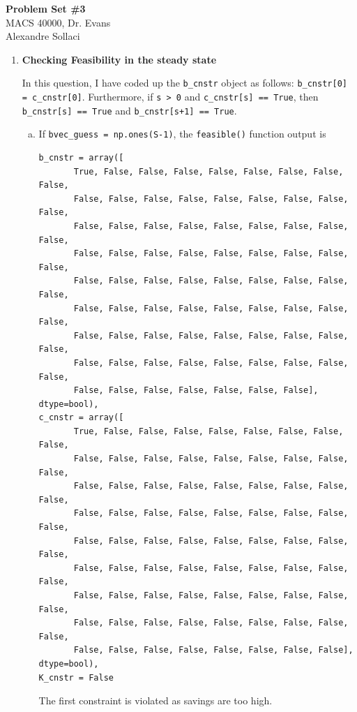 \documentclass[letterpaper,12pt]{article}
\theoremstyle{definition}
\begin{document}
\begin{flushleft}
   \textbf{\large{Problem Set \#3}} \\
   MACS 40000, Dr. Evans \\
   Alexandre Sollaci
\end{flushleft}

\vspace{5mm}

\noindent\begin{enumerate}
   \item \textbf{Checking Feasibility in the steady state}
   
   In this question, I have coded up the \texttt{b\_cnstr} object as follows: \texttt{b\_cnstr[0] = c\_cnstr[0]}. Furthermore, if \texttt{s > 0} and \texttt{c\_cnstr[s] == True}, then \texttt{b\_cnstr[s] == True} and \texttt{b\_cnstr[s+1] == True}.
	\begin{enumerate}[(a)]
		\item If \texttt{bvec\_guess = np.ones(S-1)}, the \texttt{feasible()} function output is
		
		\begin{verbatim}
b_cnstr = array([
       True, False, False, False, False, False, False, False, False,
       False, False, False, False, False, False, False, False, False,
       False, False, False, False, False, False, False, False, False,
       False, False, False, False, False, False, False, False, False,
       False, False, False, False, False, False, False, False, False,
       False, False, False, False, False, False, False, False, False,
       False, False, False, False, False, False, False, False, False,
       False, False, False, False, False, False, False, False, False,
       False, False, False, False, False, False, False], dtype=bool),
c_cnstr = array([ 
       True, False, False, False, False, False, False, False, False,
       False, False, False, False, False, False, False, False, False,
       False, False, False, False, False, False, False, False, False,
       False, False, False, False, False, False, False, False, False,
       False, False, False, False, False, False, False, False, False,
       False, False, False, False, False, False, False, False, False,
       False, False, False, False, False, False, False, False, False,
       False, False, False, False, False, False, False, False, False,
       False, False, False, False, False, False, False, False], dtype=bool),
K_cnstr = False
		\end{verbatim}
		The first constraint is violated as savings are too high.
		

\end{enumerate}
\end{enumerate}
\end{document}
